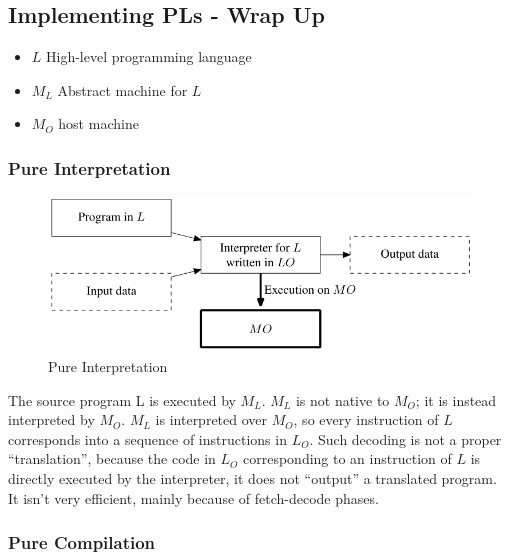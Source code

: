 
\subsection*{Implementing PLs - Wrap Up}
\begin{itemize}
    \item $L$ High-level programming language
    \item $M_L$ Abstract machine for $L$
    \item $M_O$ host machine
\end{itemize}

\subsubsection{Pure Interpretation}

\begin{figure}[htbp]
    \centering
    \includegraphics{images/am_pure_int.png}
    \caption{Pure Interpretation}
    \label{fig:am_pure_int.png}
\end{figure}

The source program L is executed by $M_L$.
$M_L$ is not native to $M_O$; it is instead interpreted by $M_O$.
$M_L$ is interpreted over $M_O$, so every instruction of $L$ corresponds into a sequence of instructions in $L_O$. Such decoding is not a proper ``translation'', because the code in $L_O$ corresponding to an instruction of $L$ is directly executed by the interpreter, it does not ``output'' a translated program.\\
It isn't very efficient, mainly because of fetch-decode phases.

\subsubsection{Pure Compilation}

